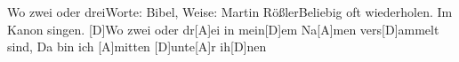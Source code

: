 \documentclass[../main.tex]{subfiles}
\begin{document}
\begin{song}{Wo zwei oder drei}{Worte: Bibel, Weise: Martin Rößler}{Beliebig oft wiederholen. Im Kanon singen.}
[D]Wo zwei oder dr[A]ei in mein[D]em Na[A]men vers[D]ammelt sind,
Da bin ich [A]mitten [D]unte[A]r ih[D]nen
\end{song}
\end{document}

